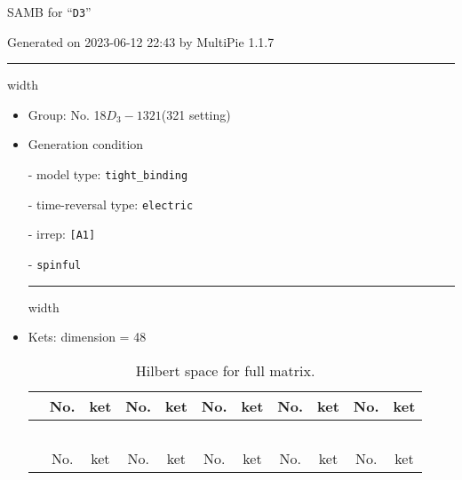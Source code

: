 \documentclass[fleqn,10pt,landscape]{article}
\begin{document}
\setcounter{MaxMatrixCols}{16}

\setlength{\baselineskip}{16pt}
\footnotesize
\begin{center}
\LARGE
SAMB for ``\texttt{D3}''
\end{center}
\begin{flushright}
Generated on 2023-06-12 22:43 by MultiPie 1.1.7
\end{flushright}
\vspace{1cm}


 \hfil \hrule height 1mm width \textwidth \hfil

\begin{itemize}
\item Group: No. 18\quad$D_{3}-1$\quad$321$\quad(321 setting)\quad[ trigonal ]

\vspace{5mm}

\item Generation condition

\quad - model type: \texttt{tight_binding}

\quad - time-reversal type: \texttt{electric}

\quad - irrep: \texttt{[A1]}

\quad - \texttt{spinful}


 \hfil \hrule height 1mm width \textwidth \hfil

\item Kets: dimension = 48
\begin{center}
\renewcommand{\arraystretch}{1.3}
\begin{longtable}{c|cc|cc|cc|cc|cc}
\caption{Hilbert space for full matrix.}
 \\
 \hline \hline
 & No. & ket & No. & ket & No. & ket & No. & ket & No. & ket \\ \hline \endfirsthead

\multicolumn{10}{l}{\tablename\ \thetable{}} \\
 \hline \hline
 & No. & ket & No. & ket & No. & ket & No. & ket & No. & ket \\ \hline \endhead


\end{longtable}
\end{center}
\end{itemize}
\end{document}
